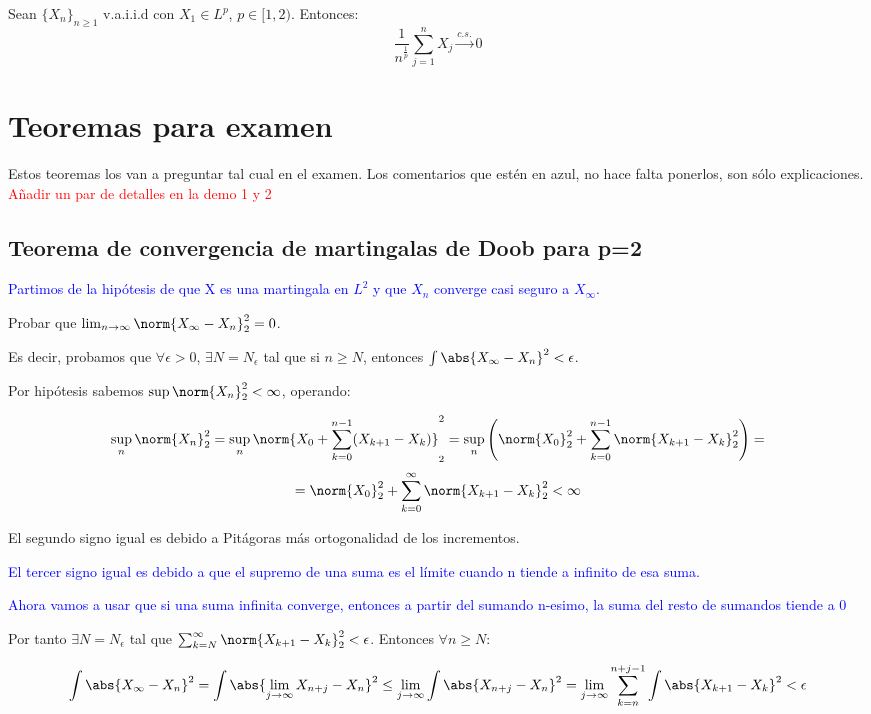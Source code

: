 \documentclass{apuntes}
\begin{document}
\begin{theorem}
Sean $\{X_n\}_{n\geq 1}$ v.a.i.i.d con $X_1 \in L^p$, $p\in [1,2)$. Entonces: 
\[
\frac{1}{n^{\frac{1}{p}}} \sum_{j=1}^{n}X_j \stackrel{c.s.}{\rightarrow} 0
\]
\end{theorem}

\chapter{Teoremas para examen}
Estos teoremas los van a preguntar tal cual en el examen. Los comentarios que estén en azul, no hace falta ponerlos, son sólo explicaciones. \textcolor{red}{Añadir un par de detalles en la demo 1 y 2}

\section{Teorema de convergencia de martingalas de Doob para p=2}
\textcolor{blue}{Partimos de la hipótesis de que X es una martingala en $L^2$ y que $X_n$ converge casi seguro a $X_{\infty}$.}

Probar que $\lim_{n \rightarrow \infty}\norm{X_{\infty}-X_n}_2^2=0$.


Es decir, probamos que $\forall \epsilon > 0$, $\exists N = N_{\epsilon}$ tal que si $n\geq N$, entonces $\int \abs{X_{\infty}-X_n}^2 < \epsilon$. 

Por hipótesis sabemos $\sup \norm{X_n}_2^2 < \infty$, operando:

\[
\sup_n \norm{X_n}_2^2 = \sup_n \norm{X_0 +\sum_{k=0}^{n-1}(X_{k+1}-X_k)}_2^2 = \sup_n \left( \norm{X_0}_2^2 +\sum_{k=0}^{n-1}\norm{X_{k+1}-X_k}_2^2 \right) =
\]
\[
= \norm{X_0}_2^2 +\sum_{k=0}^{\infty}\norm{X_{k+1}-X_k}_2^2 < \infty
\]

El segundo signo igual es debido a Pitágoras más ortogonalidad de los incrementos.

\textcolor{blue}{El tercer signo igual es debido a que el supremo de una suma es el límite cuando n tiende a infinito de esa suma.}

\textcolor{blue}{Ahora vamos a usar que si una suma infinita converge, entonces a partir del sumando n-esimo, la suma del resto de sumandos tiende a 0}

Por tanto $\exists N = N_{\epsilon}$ tal que $\sum_{k=N}^{\infty} \norm{X_{k+1}-X_k}_2^2 < \epsilon$. Entonces $\forall n \geq N$:

\[
\int \abs{X_{\infty}-X_n}^2 = \int \abs{\lim_{j \rightarrow \infty} X_{n+j}-X_n}^2 \leq \lim_{j \rightarrow \infty} \int \abs{ X_{n+j}-X_n}^2 = \lim_{j \rightarrow \infty} \sum_{k=n}^{n+j-1}\int \abs{X_{k+1}-X_k}^2 < \epsilon
\]
\end{document}
